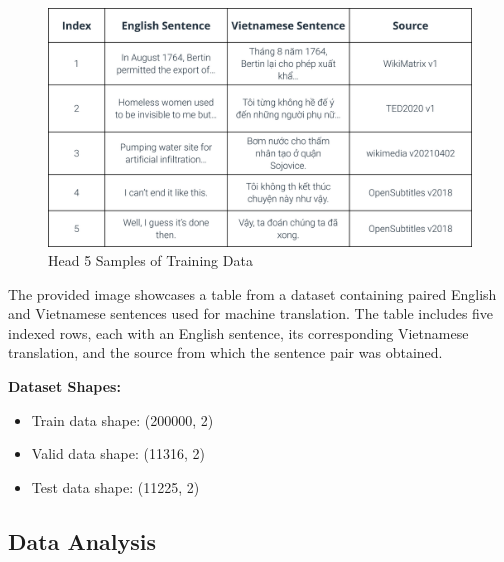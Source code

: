 \documentclass{article}
\begin{document}
\begin{figure}[H]
    \centering
    \includegraphics[width=1\linewidth]{figs/head5sample.png} %
    \caption{Head 5 Samples of Training Data}
    \label{fig:training-data}
\end{figure}
The provided image showcases a table from a dataset containing paired English and Vietnamese sentences used for machine translation. The table includes five indexed rows, each with an English sentence, its corresponding Vietnamese translation, and the source from which the sentence pair was obtained. 

\textbf{Dataset Shapes:}
\begin{itemize}
\item Train data shape: (200000, 2)
\item Valid data shape: (11316, 2)
\item Test data shape: (11225, 2)
\end{itemize}

\subsection{Data Analysis}
\end{document}
